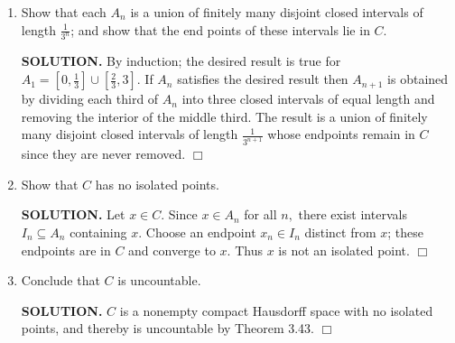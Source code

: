 \documentclass{article}
\begin{document}
\begin{enumerate}
\begin{enumerate}
        \item Show that each $A_n$ is a union of finitely many disjoint closed intervals of length $\frac{1}{3^n}$; and show that the end points of these intervals lie in $C.$

        {\bf SOLUTION.} By induction; the desired result is true for $A_1 = [0, \tfrac13] \cup [\tfrac23, 3]$. If $A_n$ satisfies the desired result then $A_{n+1}$ is obtained by dividing each third of $A_n$ into three closed intervals of equal length and removing the interior of the middle third. The result is a union of finitely many disjoint closed intervals of length $\frac{1}{3^{n+1}}$ whose endpoints remain in $C$ since they are never removed. $\Box$
        
        \item Show that $C$ has no isolated points.

        {\bf SOLUTION.} Let $x \in C.$ Since $x \in A_n$ for all $n,$ there exist intervals $I_n \subseteq A_n$ containing $x$. Choose an endpoint $x_n \in I_n$ distinct from $x$; these endpoints are in $C$ and converge to $x.$ Thus $x$ is not an isolated point. $\Box$
        
        \item Conclude that $C$ is uncountable.

        {\bf SOLUTION.} $C$ is a nonempty compact Hausdorff space with no isolated points, and thereby is uncountable by Theorem 3.43. $\Box$
    \end{enumerate}
\end{enumerate}
\end{document}
